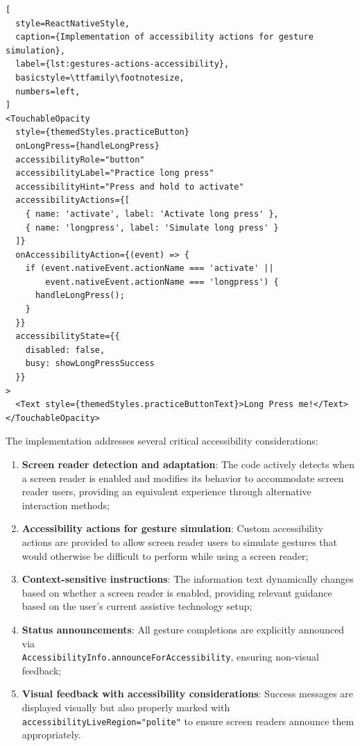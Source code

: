 \begin{lstlisting}[
  style=ReactNativeStyle,
  caption={Implementation of accessibility actions for gesture simulation},
  label={lst:gestures-actions-accessibility},
  basicstyle=\ttfamily\footnotesize,
  numbers=left,
]
<TouchableOpacity
  style={themedStyles.practiceButton}
  onLongPress={handleLongPress}
  accessibilityRole="button"
  accessibilityLabel="Practice long press"
  accessibilityHint="Press and hold to activate"
  accessibilityActions={[
    { name: 'activate', label: 'Activate long press' },
    { name: 'longpress', label: 'Simulate long press' }
  ]}
  onAccessibilityAction={(event) => {
    if (event.nativeEvent.actionName === 'activate' ||
        event.nativeEvent.actionName === 'longpress') {
      handleLongPress();
    }
  }}
  accessibilityState={{
    disabled: false,
    busy: showLongPressSuccess
  }}
>
  <Text style={themedStyles.practiceButtonText}>Long Press me!</Text>
</TouchableOpacity>
\end{lstlisting}

The implementation addresses several critical accessibility considerations:

\begin{enumerate}
    \item \textbf{Screen reader detection and adaptation}: The code actively detects when a screen reader is enabled and modifies its behavior to accommodate screen reader users, providing an equivalent experience through alternative interaction methods;
    
    \item \textbf{Accessibility actions for gesture simulation}: Custom accessibility actions are provided to allow screen reader users to simulate gestures that would otherwise be difficult to perform while using a screen reader;
    
    \item \textbf{Context-sensitive instructions}: The information text dynamically changes based on whether a screen reader is enabled, providing relevant guidance based on the user's current assistive technology setup;
    
    \item \textbf{Status announcements}: All gesture completions are explicitly announced via \\\texttt{AccessibilityInfo.announceForAccessibility}, ensuring non-visual feedback;
    
    \item \textbf{Visual feedback with accessibility considerations}: Success messages are displayed visually but also properly marked with \texttt{accessibilityLiveRegion="polite"} to ensure screen readers announce them appropriately.
\end{enumerate}

